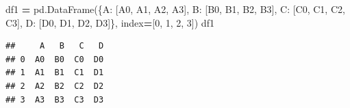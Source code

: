 \documentclass[
]{book}
\newenvironment{Shaded}{\begin{snugshade}}{\end{snugshade}}
\newcommand{\DecValTok}[1]{\textcolor[rgb]{0.00,0.00,0.81}{#1}}
\newcommand{\NormalTok}[1]{#1}
\newcommand{\OperatorTok}[1]{\textcolor[rgb]{0.81,0.36,0.00}{\textbf{#1}}}
\newcommand{\StringTok}[1]{\textcolor[rgb]{0.31,0.60,0.02}{#1}}
\theoremstyle{definition}
\theoremstyle{definition}
\theoremstyle{definition}
\theoremstyle{definition}
\theoremstyle{remark}
\begin{document}
\begin{Shaded}
\begin{Highlighting}[]
\NormalTok{df1 }\OperatorTok{=}\NormalTok{ pd.DataFrame(\{}\StringTok{\textquotesingle{}A\textquotesingle{}}\NormalTok{: [}\StringTok{\textquotesingle{}A0\textquotesingle{}}\NormalTok{, }\StringTok{\textquotesingle{}A1\textquotesingle{}}\NormalTok{, }\StringTok{\textquotesingle{}A2\textquotesingle{}}\NormalTok{, }\StringTok{\textquotesingle{}A3\textquotesingle{}}\NormalTok{],}
                    \StringTok{\textquotesingle{}B\textquotesingle{}}\NormalTok{: [}\StringTok{\textquotesingle{}B0\textquotesingle{}}\NormalTok{, }\StringTok{\textquotesingle{}B1\textquotesingle{}}\NormalTok{, }\StringTok{\textquotesingle{}B2\textquotesingle{}}\NormalTok{, }\StringTok{\textquotesingle{}B3\textquotesingle{}}\NormalTok{],}
                    \StringTok{\textquotesingle{}C\textquotesingle{}}\NormalTok{: [}\StringTok{\textquotesingle{}C0\textquotesingle{}}\NormalTok{, }\StringTok{\textquotesingle{}C1\textquotesingle{}}\NormalTok{, }\StringTok{\textquotesingle{}C2\textquotesingle{}}\NormalTok{, }\StringTok{\textquotesingle{}C3\textquotesingle{}}\NormalTok{],}
                    \StringTok{\textquotesingle{}D\textquotesingle{}}\NormalTok{: [}\StringTok{\textquotesingle{}D0\textquotesingle{}}\NormalTok{, }\StringTok{\textquotesingle{}D1\textquotesingle{}}\NormalTok{, }\StringTok{\textquotesingle{}D2\textquotesingle{}}\NormalTok{, }\StringTok{\textquotesingle{}D3\textquotesingle{}}\NormalTok{]\},}
\NormalTok{                       index}\OperatorTok{=}\NormalTok{[}\DecValTok{0}\NormalTok{, }\DecValTok{1}\NormalTok{, }\DecValTok{2}\NormalTok{, }\DecValTok{3}\NormalTok{])}
\NormalTok{df1}
\end{Highlighting}
\end{Shaded}

\begin{verbatim}
##     A   B   C   D
## 0  A0  B0  C0  D0
## 1  A1  B1  C1  D1
## 2  A2  B2  C2  D2
## 3  A3  B3  C3  D3
\end{verbatim}
\end{document}
